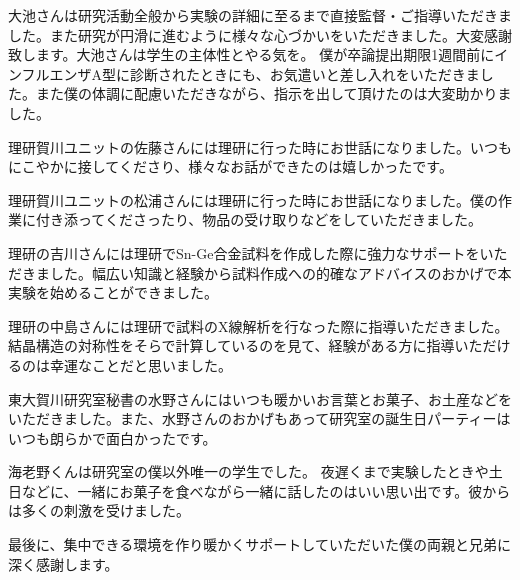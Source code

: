 大池さんは研究活動全般から実験の詳細に至るまで直接監督・ご指導いただきました。また研究が円滑に進むように様々な心づかいをいただきました。大変感謝致します。大池さんは学生の主体性とやる気を。
僕が卒論提出期限1週間前にインフルエンザA型に診断されたときにも、お気遣いと差し入れをいただきました。また僕の体調に配慮いただきながら、指示を出して頂けたのは大変助かりました。

理研賀川ユニットの佐藤さんには理研に行った時にお世話になりました。いつもにこやかに接してくださり、様々なお話ができたのは嬉しかったです。

理研賀川ユニットの松浦さんには理研に行った時にお世話になりました。僕の作業に付き添ってくださったり、物品の受け取りなどをしていただきました。

理研の吉川さんには理研でSn-Ge合金試料を作成した際に強力なサポートをいただきました。幅広い知識と経験から試料作成への的確なアドバイスのおかげで本実験を始めることができました。

理研の中島さんには理研で試料のX線解析を行なった際に指導いただきました。結晶構造の対称性をそらで計算しているのを見て、経験がある方に指導いただけるのは幸運なことだと思いました。

東大賀川研究室秘書の水野さんにはいつも暖かいお言葉とお菓子、お土産などをいただきました。また、水野さんのおかげもあって研究室の誕生日パーティーはいつも朗らかで面白かったです。

海老野くんは研究室の僕以外唯一の学生でした。
夜遅くまで実験したときや土日などに、一緒にお菓子を食べながら一緒に話したのはいい思い出です。彼からは多くの刺激を受けました。

最後に、集中できる環境を作り暖かくサポートしていただいた僕の両親と兄弟に深く感謝します。

\newpage